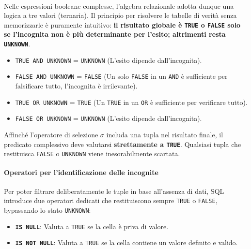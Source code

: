\paragraph{}
Nelle espressioni booleane complesse, l'algebra relazionale adotta dunque una logica a tre valori (ternaria). Il principio per risolvere le tabelle di verità senza memorizzarle è puramente intuitivo: \textbf{il risultato globale è \texttt{TRUE} o \texttt{FALSE} solo se l'incognita non è più determinante per l'esito; altrimenti resta \texttt{UNKNOWN}}.
\begin{itemize}
    \item \texttt{TRUE AND UNKNOWN} = \texttt{UNKNOWN} (L'esito dipende dall'incognita).
    \item \texttt{FALSE AND UNKNOWN} = \texttt{FALSE} (Un solo \texttt{FALSE} in un \texttt{AND} è sufficiente per falsificare tutto, l'incognita è irrilevante).
    \item \texttt{TRUE OR UNKNOWN} = \texttt{TRUE} (Un \texttt{TRUE} in un \texttt{OR} è sufficiente per verificare tutto).
    \item \texttt{FALSE OR UNKNOWN} = \texttt{UNKNOWN} (L'esito dipende dall'incognita).
\end{itemize}

\begin{warningbox}
Affinché l'operatore di selezione $\sigma$ includa una tupla nel risultato finale, il predicato complessivo deve valutarsi \textbf{strettamente a \texttt{TRUE}}. Qualsiasi tupla che restituisca \texttt{FALSE} o \texttt{UNKNOWN} viene inesorabilmente scartata.
\end{warningbox}

\paragraph{Operatori per l'identificazione delle incognite}
Per poter filtrare deliberatamente le tuple in base all'assenza di dati, SQL introduce due operatori dedicati che restituiscono sempre \texttt{TRUE} o \texttt{FALSE}, bypassando lo stato \texttt{UNKNOWN}:
\begin{itemize}
    \item \texttt{\textbf{IS NULL}}: Valuta a \texttt{TRUE} se la cella è priva di valore.
    \item \texttt{\textbf{IS NOT NULL}}: Valuta a \texttt{TRUE} se la cella contiene un valore definito e valido.
\end{itemize}

